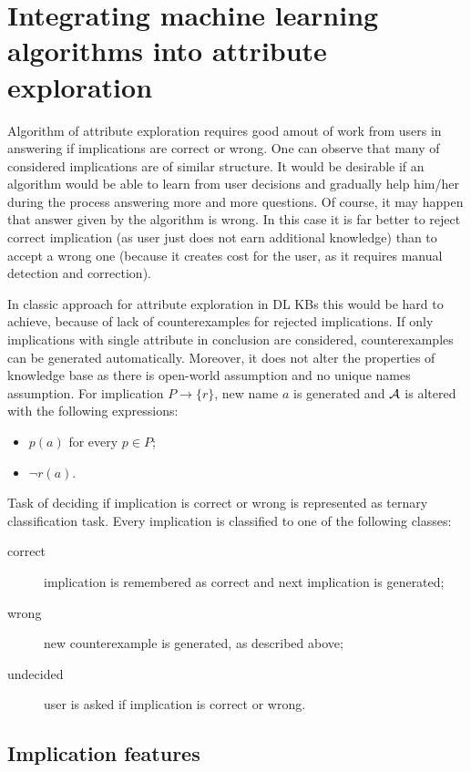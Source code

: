 \documentclass{llncs}
\newcommand{\abox}{\ensuremath\mathcal{A}}
\begin{document}
\section{Integrating machine learning algorithms into attribute exploration}

Algorithm of attribute exploration requires good amout of work from users in answering if implications are correct or wrong. One can observe that many of considered implications are of similar structure. It would be desirable if an algorithm would be able to learn from user decisions and gradually help him/her during the process answering more and more questions. Of course, it may happen that answer given by the algorithm is wrong. In this case it is far better to reject correct implication (as user just does not earn additional knowledge) than to accept a wrong one (because it creates cost for the user, as it requires manual detection and correction).

In classic approach for attribute exploration in DL KBs this would be hard to achieve, because of lack of counterexamples for rejected implications. If only implications with single attribute in conclusion are considered, counterexamples can be generated automatically. Moreover, it does not alter the properties of knowledge base as there is open-world assumption and no unique names assumption. For implication $P\to\{r\}$, new name $a$ is generated and $\abox$ is altered with the following expressions:
\begin{itemize}
\item $p(a)$ for every $p\in P$;
\item $\lnot r(a)$.
\end{itemize}

Task of deciding if implication is correct or wrong is represented as ternary classification task. Every implication is classified to one of the following classes:
\begin{description}
\item[correct] implication is remembered as correct and next implication is generated;
\item[wrong] new counterexample is generated, as described above;
\item[undecided] user is asked if implication is correct or wrong. 
\end{description}

\subsection{Implication features}
\end{document}
